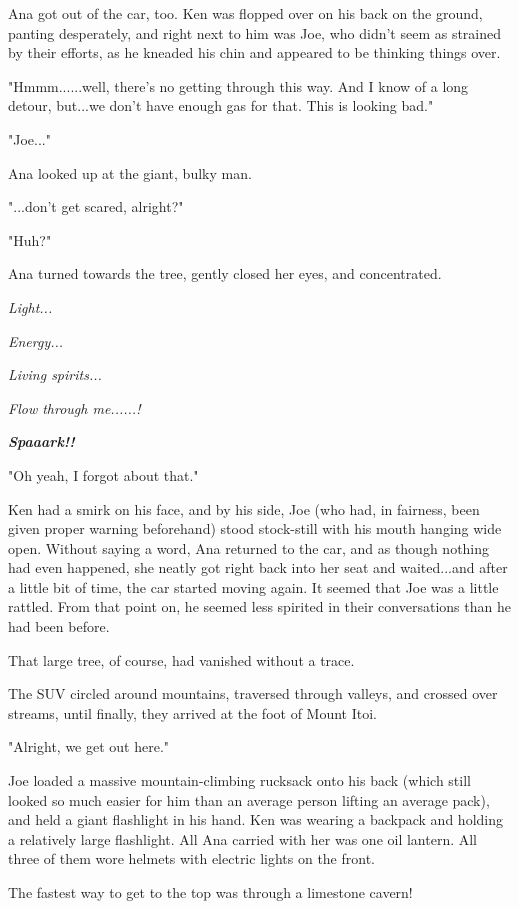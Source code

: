 \documentclass[
]{article}
\begin{document}
Ana got out of the car, too. Ken was flopped over on his back on the
ground, panting desperately, and right next to him was Joe, who didn't
seem as strained by their efforts, as he kneaded his chin and appeared
to be thinking things over.

"Hmmm......well, there's no getting through this way. And I know of a
long detour, but...we don't have enough gas for that. This is looking
bad."

"Joe..."

Ana looked up at the giant, bulky man.

"...don't get scared, alright?"

"Huh?"

Ana turned towards the tree, gently closed her eyes, and concentrated.

\emph{Light...}

\emph{Energy...}

\emph{Living spirits...}

\emph{Flow through me......!}

\emph{\textbf{Spaaark!!}}

\emph{}"Oh yeah, I forgot about that."

Ken had a smirk on his face, and by his side, Joe (who had, in fairness,
been given proper warning beforehand) stood stock-still with his mouth
hanging wide open. Without saying a word, Ana returned to the car, and
as though nothing had even happened, she neatly got right back into her
seat and waited...and after a little bit of time, the car started moving
again. It seemed that Joe was a little rattled. From that point on, he
seemed less spirited in their conversations than he had been before.

That large tree, of course, had vanished without a trace.

The SUV circled around mountains, traversed through valleys, and crossed
over streams, until finally, they arrived at the foot of Mount Itoi.

"Alright, we get out here."

Joe loaded a massive mountain-climbing rucksack onto his back (which
still looked so much easier for him than an average person lifting an
average pack), and held a giant flashlight in his hand. Ken was wearing
a backpack and holding a relatively large flashlight. All Ana carried
with her was one oil lantern. All three of them wore helmets with
electric lights on the front.

The fastest way to get to the top was through a limestone cavern!
\end{document}
